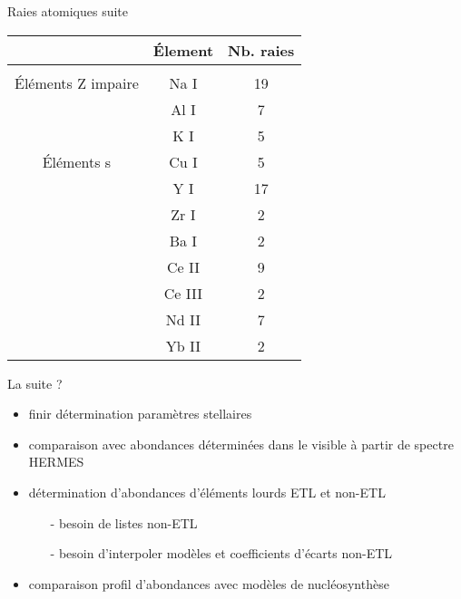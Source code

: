 \documentclass[10pt]{beamer}
\begin{document}
\begin{frame}[fragile]{Raies atomiques suite}

    \begin{table}[h!]
        \begin{center}
            \begin{tabular}{c|c|c}
                &Élement&Nb. raies\\
                \hline
                &&\\ 
                Éléments Z impaire & Na I &19\\
                 & Al I &7\\
                 & K I &5 \\
                Éléments s & Cu I & 5\\
                 & Y I & 17\\
                 & Zr I & 2\\
                 & Ba I & 2\\
                 & Ce II & 9\\
                 & Ce III & 2\\
                 & Nd II & 7\\
                 & Yb II & 2\\
            \end{tabular}
        \end{center}
    \end{table}

\end{frame}

\begin{frame}[fragile]{La suite ?}
    \begin{itemize}
        \item finir détermination paramètres stellaires
        \item comparaison avec abondances déterminées dans le visible à partir de spectre HERMES
        \item détermination  d'abondances d'éléments lourds ETL et non-ETL
        \begin{itemize}
            \item [-] besoin de listes non-ETL
            \item [-] besoin d'interpoler modèles et coefficients d'écarts non-ETL
        \end{itemize}
        \item comparaison profil d'abondances avec modèles de nucléosynthèse
    \end{itemize} 
\end{frame}
\end{document}
